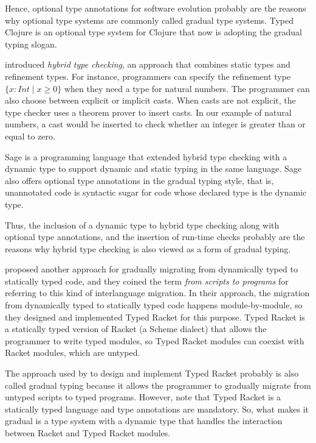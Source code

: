 \documentclass[preprint]{sig-alternate}
\begin{document}
Hence, optional type annotations for software evolution probably are
the reasons why optional type systems are commonly called
gradual type systems.
Typed Clojure \citep{bonnaire-sergeant2012typed-clojure} is an
optional type system for Clojure that now is adopting the
gradual typing slogan.

\citet{flanagan2006htc} introduced \textit{hybrid type checking},
an approach that combines static types and refinement types.
For instance, programmers can specify the refinement type
$\{x:Int \;|\; x \ge 0\}$ when they need a type for natural numbers.
The programmer can also choose between explicit or implicit casts.
When casts are not explicit, the type checker uses a theorem prover
to insert casts.
In our example of natural numbers, a cast would be inserted to check
whether an integer is greater than or equal to zero.

Sage \citep{gronski2006sage} is a programming language that
extended hybrid type checking with a dynamic type to
support dynamic and static typing in the same language.
Sage also offers optional type annotations in the gradual typing
style, that is, unannotated code is syntactic sugar for
code whose declared type is the dynamic type.

Thus, the inclusion of a dynamic type to hybrid type checking
along with optional type annotations, and the insertion of run-time
checks probably are the reasons why hybrid type checking is
also viewed as a form of gradual typing. 

\citet{tobin-hochstadt2006ims} proposed another approach for gradually
migrating from dynamically typed to statically typed code,
and they coined the term \textit{from scripts to programs} for
referring to this kind of interlanguage migration.
In their approach, the migration from dynamically typed to
statically typed code happens module-by-module, so they designed
and implemented Typed Racket \citep{tobin-hochstadt2008ts} for
this purpose.
Typed Racket is a statically typed version of Racket
(a Scheme dialect) that allows the programmer to write typed modules,
so Typed Racket modules can coexist with Racket modules,
which are untyped.

The approach used by \citet{tobin-hochstadt2008ts} to design and
implement Typed Racket probably is also called gradual typing
because it allows the programmer to gradually migrate from untyped
scripts to typed programs.
However, note that Typed Racket is a statically typed language
and type annotations are mandatory.
So, what makes it gradual is a type system with a dynamic type
that handles the interaction between Racket and Typed Racket modules.
\end{document}
